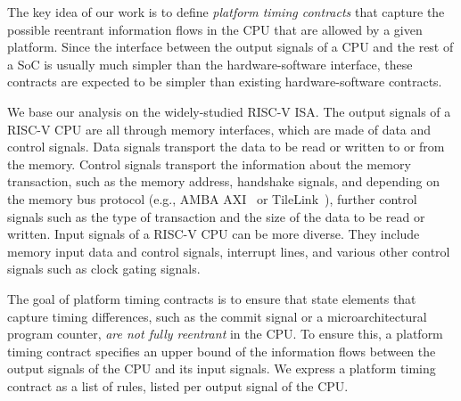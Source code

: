 The key idea of our work is to define \emph{platform timing contracts} that capture the possible reentrant information flows in the CPU that are allowed by a given platform.
Since the interface between the output signals of a CPU and the rest of a SoC is usually much simpler than the hardware-software interface, these contracts are expected to be simpler than existing hardware-software contracts.

We base our analysis on the widely-studied RISC-V ISA.
The output signals of a RISC-V CPU are all through memory interfaces, which are made of data and control signals.
Data signals transport the data to be read or written to or from the memory.
Control signals transport the information about the memory transaction, such as the memory address, handshake signals, and depending on the memory bus protocol (e.g., AMBA AXI~\cite{arm_amba} or TileLink~\cite{tilelink_spec}), further control signals such as the type of transaction and the size of the data to be read or written.
Input signals of a RISC-V CPU can be more diverse.
They include memory input data and control signals, interrupt lines, and various other control signals such as clock gating signals.

The goal of platform timing contracts is to ensure that state elements that capture timing differences, such as the commit signal or a microarchitectural program counter, \emph{are not fully reentrant} in the CPU.
To ensure this, a platform timing contract specifies an upper bound of the information flows between the output signals of the CPU and its input signals.
We express a platform timing contract as a list of rules, listed per output signal of the CPU.


